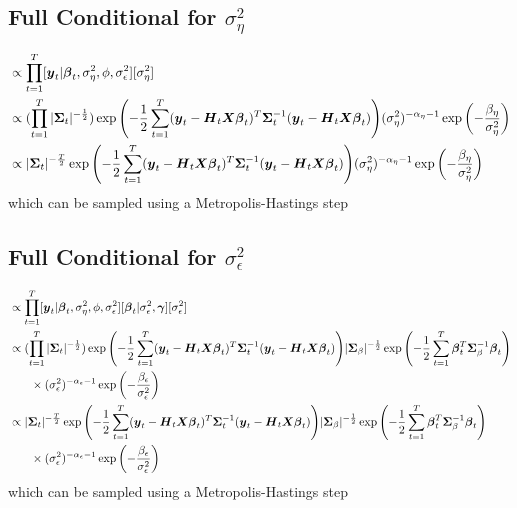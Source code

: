 \documentclass[fleqn]{article}
\def\bm#1{\mbox{\boldmath $#1$}}
\begin{document}
\subsection{Full Conditional for $\sigma^2_\eta$}
%
\begin{align*}
[\sigma^2_\eta | \cdot] & \propto \prod_{t = 1}^T [\bm{y}_t | \bm{\beta}_t, \sigma^2_\eta, \phi, \sigma^2_\epsilon] [\sigma^2_\eta]\\
%
& \propto (\prod_{t = 1}^T |\bm{\Sigma}_t |^{ - \frac{1} {2}}) \exp{ \left( - \frac{1} {2} \sum_{t = 1}^T (\bm{y}_t - \bm{H}_t \bm{X} \bm{\beta}_t)^T \bm{\Sigma}_t^{ - 1} (\bm{y}_t - \bm{H}_t \bm{X} \bm{\beta}_t) \right) } (\sigma^2_\eta)^{ - \alpha_\eta - 1} \exp{ \left( - \frac{\beta_\eta} {\sigma^2_\eta} \right) }\\
%
& \propto |\bm{\Sigma}_t |^{ - \frac{T} {2}} \exp{ \left( - \frac{1} {2} \sum_{t = 1}^T (\bm{y}_t - \bm{H}_t \bm{X} \bm{\beta}_t)^T \bm{\Sigma}_t^{ - 1} (\bm{y}_t - \bm{H}_t \bm{X} \bm{\beta}_t) \right) } (\sigma^2_\eta)^{ - \alpha_\eta - 1} \exp{ \left( - \frac{\beta_\eta} {\sigma^2_\eta} \right) }\\
\end{align*}
% 
which can be sampled using a Metropolis-Hastings step
%
\subsection{Full Conditional for $\sigma^2_\epsilon$}
%
\begin{align*}
[\sigma^2_\epsilon | \cdot] & \propto \prod_{t = 1}^T [\bm{y}_t | \bm{\beta}_t, \sigma^2_\eta, \phi, \sigma^2_\epsilon] [\bm{\beta}_t | \sigma^2_\epsilon, \bm{\gamma}] [\sigma^2_\epsilon]\\
%
& \propto (\prod_{t = 1}^T |\bm{\Sigma}_t |^{ - \frac{1} {2}}) \exp{ \left( - \frac{1} {2} \sum_{t = 1}^T (\bm{y}_t - \bm{H}_t \bm{X} \bm{\beta}_t)^T \bm{\Sigma}_t^{ - 1} (\bm{y}_t - \bm{H}_t \bm{X} \bm{\beta}_t) \right) } |\bm{\Sigma}_\beta |^{ - \frac{1} {2}} \exp{ \left( - \frac{1} {2} \sum_{t = 1}^T \bm{\beta}_t^T \bm{\Sigma}_{\beta}^{ - 1} \bm{\beta}_t \right) }\\
& \phantom{{}=1} \times (\sigma^2_\epsilon)^{ - \alpha_\epsilon - 1} \exp{ \left( - \frac{\beta_\epsilon} {\sigma^2_\epsilon} \right) }\\
%
& \propto |\bm{\Sigma}_t |^{ - \frac{T} {2}} \exp{ \left( - \frac{1} {2} \sum_{t = 1}^T (\bm{y}_t - \bm{H}_t \bm{X} \bm{\beta}_t)^T \bm{\Sigma}_t^{ - 1} (\bm{y}_t - \bm{H}_t \bm{X} \bm{\beta}_t) \right) } |\bm{\Sigma}_\beta |^{ - \frac{1} {2}} \exp{ \left( - \frac{1} {2} \sum_{t = 1}^T \bm{\beta}_t^T \bm{\Sigma}_{\beta}^{ - 1} \bm{\beta}_t \right) }\\
& \phantom{{}=1} \times (\sigma^2_\epsilon)^{ - \alpha_\epsilon - 1} \exp{ \left( - \frac{\beta_\epsilon} {\sigma^2_\epsilon} \right) }\\
\end{align*}
% 
which can be sampled using a Metropolis-Hastings step
%
\end{document}
